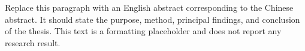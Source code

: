 \begin{enabstract}
Replace this paragraph with an English abstract corresponding to the Chinese
abstract. It should state the purpose, method, principal findings, and conclusion
of the thesis. This text is a formatting placeholder and does not report any
research result.

\end{enabstract}
